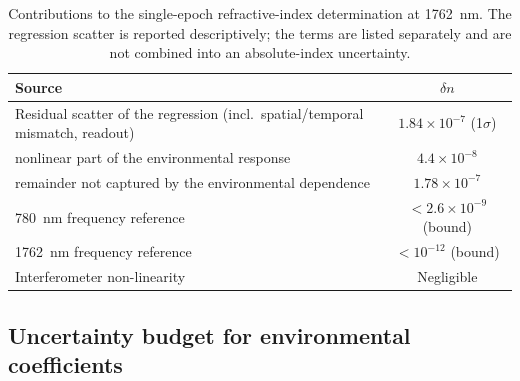 \documentclass[aps,prapplied,reprint,superscriptaddress]{revtex4-2}
\begin{document}
\begin{table}[htbp]
\centering
\caption{Contributions to the single-epoch refractive-index determination at \SI{1762}{\nano\meter}. The regression scatter is reported descriptively; the terms are listed separately and are not combined into an absolute-index uncertainty.}
\label{tab:S1a}
\begin{tabular}{lc}
\hline
Source & $\delta n$ \\
\hline
Residual scatter of the regression (incl.\ spatial/temporal mismatch, readout) & $1.84 \times 10^{-7}$ (1$\sigma$) \\
\quad nonlinear part of the environmental response & $4.4 \times 10^{-8}$ \\
\quad remainder not captured by the environmental dependence & $1.78 \times 10^{-7}$ \\
\SI{780}{\nano\meter} frequency reference   & $< 2.6 \times 10^{-9}$ (bound) \\
\SI{1762}{\nano\meter} frequency reference & $< 10^{-12}$ (bound) \\
Interferometer non-linearity & Negligible \\
\hline
\end{tabular}
\end{table}

\subsection{Uncertainty budget for environmental coefficients}
\label{sec:S1b}
\end{document}
